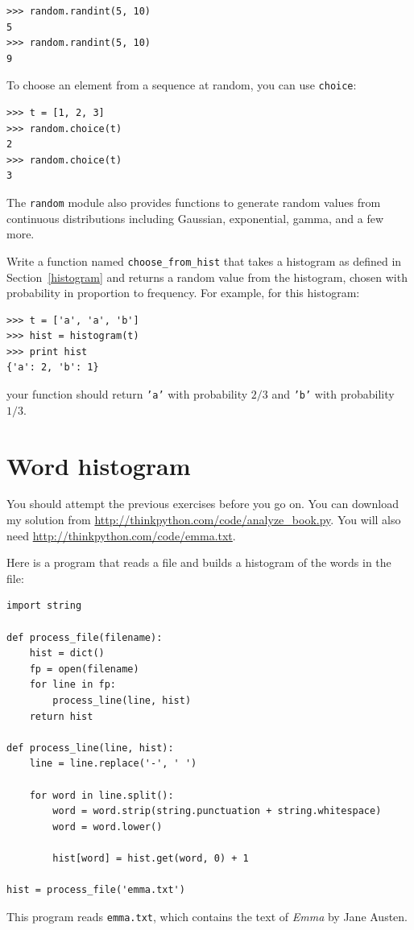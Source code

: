 \documentclass[10pt]{book}
\begin{document}
\begin{verbatim}
>>> random.randint(5, 10)
5
>>> random.randint(5, 10)
9
\end{verbatim}
%
To choose an element from a sequence at random, you can use
{\tt choice}:

\begin{verbatim}
>>> t = [1, 2, 3]
>>> random.choice(t)
2
>>> random.choice(t)
3
\end{verbatim}
%
The {\tt random} module also provides functions to generate
random values from continuous distributions including
Gaussian, exponential, gamma, and a few more.

\begin{exercise}

Write a function named \verb"choose_from_hist" that takes
a histogram as defined in Section~\ref{histogram} and returns a 
random value from the histogram, chosen with probability
in proportion to frequency.  For example, for this histogram:

\begin{verbatim}
>>> t = ['a', 'a', 'b']
>>> hist = histogram(t)
>>> print hist
{'a': 2, 'b': 1}
\end{verbatim}
%
your function should return {\tt 'a'} with probability $2/3$ and {\tt 'b'}
with probability $1/3$.
\end{exercise}


\section{Word histogram}

You should attempt the previous exercises before you go on.
You can download my solution from
 \url{http://thinkpython.com/code/analyze_book.py}.  You will
also need \url{http://thinkpython.com/code/emma.txt}.

Here is a program that reads a file and builds a histogram of the
words in the file:

\begin{verbatim}
import string

def process_file(filename):
    hist = dict()
    fp = open(filename)
    for line in fp:
        process_line(line, hist)
    return hist

def process_line(line, hist):
    line = line.replace('-', ' ')
    
    for word in line.split():
        word = word.strip(string.punctuation + string.whitespace)
        word = word.lower()

        hist[word] = hist.get(word, 0) + 1

hist = process_file('emma.txt')
\end{verbatim}
%
This program reads {\tt emma.txt}, which contains the text of {\em
  Emma} by Jane Austen.
\end{document}
